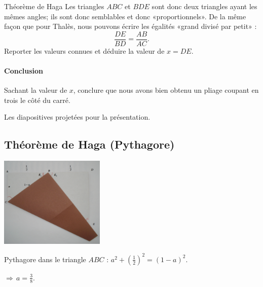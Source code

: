 \begin{feuilleExo}{Théorème de Haga}
Les triangles \( ABC\) et \( BDE\) sont donc deux triangles ayant les mêmes angles; ils sont donc semblables et donc «proportionnels». De la même façon que pour Thalès, nous pouvons écrire les égalités «grand divisé par petit» :
\begin{equation}
    \frac{ DE }{ BD }=\frac{ AB }{ AC }.
\end{equation}
Reporter les valeurs connues et déduire la valeur de \( x=DE\).

\paragraph{Conclusion}

Sachant la valeur de \( x\), conclure que nous avons bien obtenu un pliage coupant en trois le côté du carré.

\end{feuilleExo}


Les diapositives projetées pour la présentation. 

\newpage
\subsection{Théorème de Haga (Pythagore)}

    \begin{multicols}{2}

    \begin{center}        
        \includegraphics[width=5cm]{haga_coupe_anote.pdf}
    \end{center}


    Pythagore dans le triangle \( ABC\) : \( a^2+\left( \frac{ 1 }{2} \right)^2=(1-a)^2\).

    \( \Rightarrow \, a=\frac{ 3 }{ 8 }\).
    \end{multicols}

    
\newpage
